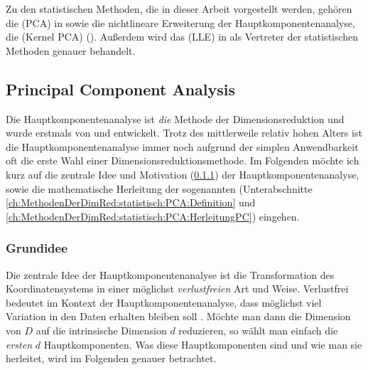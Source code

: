 Zu den statistischen Methoden, die in dieser Arbeit vorgestellt werden, gehören die
 (PCA) in  sowie
die nichtlineare Erweiterung der Hauptkomponentenanalyse, die  (Kernel PCA) (). Außerdem wird das
 (LLE) in  als
Vertreter der statistischen Methoden genauer behandelt.

\subsection{Principal Component Analysis}
\label{ch:MethodenDerDimRed:statistisch:PCA}

Die Hauptkomponentenanalyse ist \textit{die} Methode der Dimensionsreduktion und wurde erstmals von
\textcite{Pearson.1901} und \textcite{Hotelling.1933} entwickelt. Trotz des mittlerweile relativ
hohen Alters ist die Hauptkomponentenanalyse immer noch aufgrund der simplen Anwendbarkeit oft die
erste Wahl einer Dimensionsreduktionsmethode. Im Folgenden möchte ich kurz auf die zentrale Idee
und Motivation (\ref{ch:MethodenDerDimRed:statistisch:PCA:Grundidee}) der Hauptkomponentenanalyse,
sowie die mathematische Herleitung der sogenannten  (Unterabschnitte
\ref{ch:MethodenDerDimRed:statistisch:PCA:Definition} und
\ref{ch:MethodenDerDimRed:statistisch:PCA:HerleitungPC}) eingehen.

\subsubsection{Grundidee}
\label{ch:MethodenDerDimRed:statistisch:PCA:Grundidee}
Die zentrale Idee der Hauptkomponentenanalyse ist die Transformation des Koordinatensystems in einer möglichst \textit{verlustfreien} Art und Weise. Verlustfrei bedeutet im Kontext der Hauptkomponentenanalyse, dass möglichst viel Variation in den Daten erhalten bleiben soll \parencite[vgl.][1]{Jolliffe.2002}. Möchte man dann die Dimension von $D$ auf die intrinsische
Dimension $d$ reduzieren, so wählt man einfach die \textit{ersten} $d$ Hauptkomponenten.
Was diese Hauptkomponenten sind und wie man sie herleitet, wird im Folgenden genauer betrachtet.

